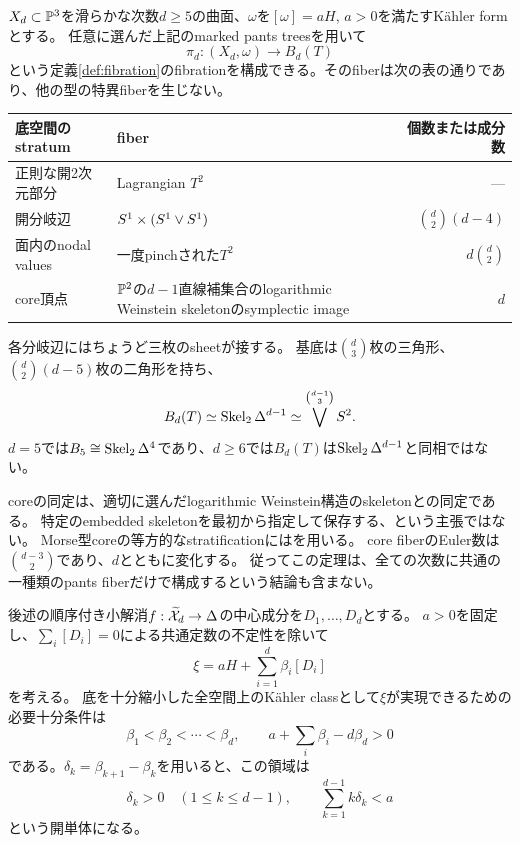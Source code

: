 \begin{theorem}[境界のない分岐底空間への構成]\label{main:global}
$X_d\subset\mathbb P^3$を滑らかな次数$d\ge5$の曲面、$\omega$を$[\omega]=aH$, $a>0$を満たすKähler formとする。
任意に選んだ上記のmarked pants treesを用いて
\[
\pi_d:(X_d,\omega)\longrightarrow B_d(T)
\]
という定義\ref{def:fibration}のfibrationを構成できる。そのfiberは次の表の通りであり、他の型の特異fiberを生じない。
\begin{center}
\begin{tabularx}{\linewidth}{@{}lXr@{}}
\toprule
底空間のstratum & fiber & 個数または成分数\\
\midrule
正則な開2次元部分 & Lagrangian $T^2$ & ---\\
開分岐辺 & $S^1\times(S^1\vee S^1)$ & $\binom d2(d-4)$\\
面内のnodal values & 一度pinchされた$T^2$ & $d\binom d2$\\
core頂点 & $\mathbb P^2$の$d-1$直線補集合のlogarithmic Weinstein skeletonのsymplectic image & $d$\\
\bottomrule
\end{tabularx}
\end{center}
各分岐辺にはちょうど三枚のsheetが接する。
基底は$\binom d3$枚の三角形、$\binom d2(d-5)$枚の二角形を持ち、
\[
B_d(T)\simeq\operatorname{Skel}_2\Delta^{d-1}\simeq\bigvee^{\binom{d-1}{3}}S^2.
\]
$d=5$では$B_5\cong\operatorname{Skel}_2\Delta^4$であり、$d\ge6$では$B_d(T)$は$\operatorname{Skel}_2\Delta^{d-1}$と同相ではない。
\end{theorem}

coreの同定は、適切に選んだlogarithmic Weinstein構造のskeletonとの同定である。
特定のembedded skeletonを最初から指定して保存する、という主張ではない。
Morse型coreの等方的なstratificationには\cite[\S2.3]{EM}を用いる。
core fiberのEuler数は$\binom{d-3}{2}$であり、$d$とともに変化する。
従ってこの定理は、全ての次数に共通の一種類のpants fiberだけで構成するという結論も含まない。

\begin{theorem}\label{main:cone}
後述の順序付き小解消$f:\widetilde{\mathcal X}_d\to\Delta$の中心成分を$D_1,\ldots,D_d$とする。
$a>0$を固定し、$\sum_i[D_i]=0$による共通定数の不定性を除いて
\[
\xi=aH+\sum_{i=1}^d\beta_i[D_i]
\]
を考える。
底を十分縮小した全空間上のKähler classとして$\xi$が実現できるための必要十分条件は
\[
\beta_1<\beta_2<\cdots<\beta_d,
\qquad a+\sum_i\beta_i-d\beta_d>0
\]
である。$\delta_k=\beta_{k+1}-\beta_k$を用いると、この領域は
\[
\delta_k>0\quad(1\le k\le d-1),\qquad
\sum_{k=1}^{d-1}k\delta_k<a
\]
という開単体になる。
\end{theorem}

